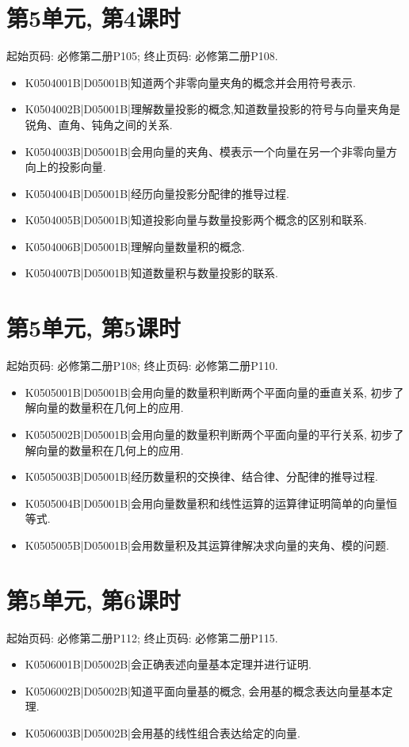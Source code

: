 \section*{第5单元, 第4课时}
起始页码: 必修第二册P105; 终止页码: 必修第二册P108.
\begin{itemize}
\item K0504001B|D05001B|知道两个非零向量夹角的概念并会用符号表示.
\item K0504002B|D05001B|理解数量投影的概念,知道数量投影的符号与向量夹角是锐角、直角、钝角之间的关系.
\item K0504003B|D05001B|会用向量的夹角、模表示一个向量在另一个非零向量方向上的投影向量.
\item K0504004B|D05001B|经历向量投影分配律的推导过程.
\item K0504005B|D05001B|知道投影向量与数量投影两个概念的区别和联系.
\item K0504006B|D05001B|理解向量数量积的概念.
\item K0504007B|D05001B|知道数量积与数量投影的联系.
\end{itemize}

\section*{第5单元, 第5课时}
起始页码: 必修第二册P108; 终止页码: 必修第二册P110.
\begin{itemize}
\item K0505001B|D05001B|会用向量的数量积判断两个平面向量的垂直关系, 初步了解向量的数量积在几何上的应用.
\item K0505002B|D05001B|会用向量的数量积判断两个平面向量的平行关系, 初步了解向量的数量积在几何上的应用.
\item K0505003B|D05001B|经历数量积的交换律、结合律、分配律的推导过程.
\item K0505004B|D05001B|会用向量数量积和线性运算的运算律证明简单的向量恒等式.
\item K0505005B|D05001B|会用数量积及其运算律解决求向量的夹角、模的问题.
\end{itemize}

\section*{第5单元, 第6课时}
起始页码: 必修第二册P112; 终止页码: 必修第二册P115.
\begin{itemize}
\item K0506001B|D05002B|会正确表述向量基本定理并进行证明.
\item K0506002B|D05002B|知道平面向量基的概念, 会用基的概念表达向量基本定理.
\item K0506003B|D05002B|会用基的线性组合表达给定的向量.
\end{itemize}

